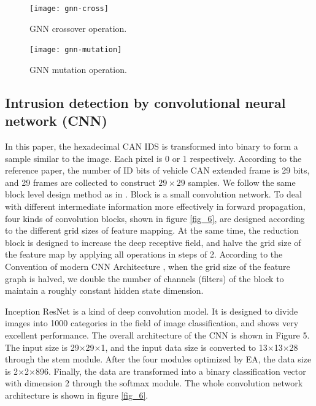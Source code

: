 \documentclass[lettersize,journal]{IEEEtran}
\begin{document}
\begin{figure}[!t]
\centering
\texttt{[image: gnn-cross]}
\caption{GNN crossover operation.}
\label{fig_4}
\end{figure}

\begin{figure}[!t]
\centering
\texttt{[image: gnn-mutation]}
\caption{GNN mutation operation.}
\label{fig_5}
\end{figure}

\subsection{Intrusion detection by convolutional neural network (CNN)}

In this paper, the hexadecimal CAN IDS is transformed into binary to form a sample similar to the image. Each pixel is 0 or 1 respectively. According to the reference paper, the number of ID bits of vehicle CAN extended frame is 29 bits, and 29 frames are collected to construct $29\times29$ samples.  We follow the same block level design method as in \cite{68,69,70}. Block is a small convolution network. To deal with different intermediate information more effectively in forward propagation, four kinds of convolution blocks, shown in figure \ref{fig_6}, are designed according to the different grid sizes of feature mapping. At the same time, the reduction block is designed to increase the deep receptive field, and halve the grid size of the feature map by applying all operations in steps of 2. According to the Convention of modern CNN Architecture \cite{71,72,73}, when the grid size of the feature graph is halved, we double the number of channels (filters) of the block to maintain a roughly constant hidden state dimension.

Inception ResNet is a kind of deep convolution model. It is designed to divide images into 1000 categories in the field of image classification, and shows very excellent performance. The overall architecture of the CNN is shown in Figure 5. The input size is 29$\times$29$\times$1, and the input data size is converted to 13$\times$13$\times$28 through the stem module. After the four modules optimized by EA, the data size is 2$\times$2$\times$896. Finally, the data are transformed into a binary classification vector with dimension 2 through the softmax module. The whole convolution network architecture is shown in figure \ref{fig_6}.
\end{document}

